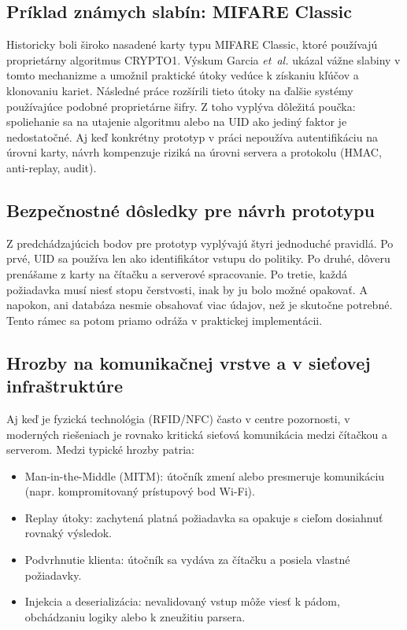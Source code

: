 \documentclass[journal,a4paper,onecolumn]{IEEEtran}
\begin{document}
\subsection{Príklad známych slabín: MIFARE Classic}

Historicky boli široko nasadené karty typu MIFARE Classic\cite{ISO14443}, ktoré používajú proprietárny algoritmus CRYPTO1. Výskum Garcia \emph{et~al.}\cite{GarciaMIFARE2008} ukázal vážne slabiny v tomto mechanizme a umožnil praktické útoky vedúce k získaniu kľúčov a klonovaniu kariet. Následné práce\cite{VerdultMIFARE2015} rozšírili tieto útoky na ďalšie systémy používajúce podobné proprietárne šifry. Z toho vyplýva dôležitá poučka: spoliehanie sa na utajenie algoritmu alebo na UID ako jediný faktor je nedostatočné. Aj keď konkrétny prototyp v práci nepoužíva autentifikáciu na úrovni karty, návrh kompenzuje riziká na úrovni servera a protokolu (HMAC, anti-replay, audit).

\subsection{Bezpečnostné dôsledky pre návrh prototypu}

Z predchádzajúcich bodov pre prototyp vyplývajú štyri jednoduché pravidlá. Po prvé, UID sa používa len ako identifikátor vstupu do politiky. Po druhé, dôveru prenášame z karty na čítačku a serverové spracovanie. Po tretie, každá požiadavka musí niesť stopu čerstvosti, inak by ju bolo možné opakovať. A napokon, ani databáza nesmie obsahovať viac údajov, než je skutočne potrebné. Tento rámec sa potom priamo odráža v praktickej implementácii.


\subsection{Hrozby na komunikačnej vrstve a v sieťovej infraštruktúre}

Aj keď je fyzická technológia (RFID/NFC) často v centre pozornosti, v moderných riešeniach je rovnako kritická sieťová komunikácia medzi čítačkou a serverom. Medzi typické hrozby patria:

\begin{itemize}[leftmargin=*,itemsep=2pt]
  \item Man-in-the-Middle (MITM): útočník zmení alebo presmeruje komunikáciu (napr. kompromitovaný prístupový bod Wi-Fi).
  \item Replay útoky: zachytená platná požiadavka sa opakuje s cieľom dosiahnuť rovnaký výsledok.
  \item Podvrhnutie klienta: útočník sa vydáva za čítačku a posiela vlastné požiadavky.
  \item Injekcia a deserializácia: nevalidovaný vstup môže viesť k pádom, obchádzaniu logiky alebo k zneužitiu parsera.
\end{itemize}
\end{document}
